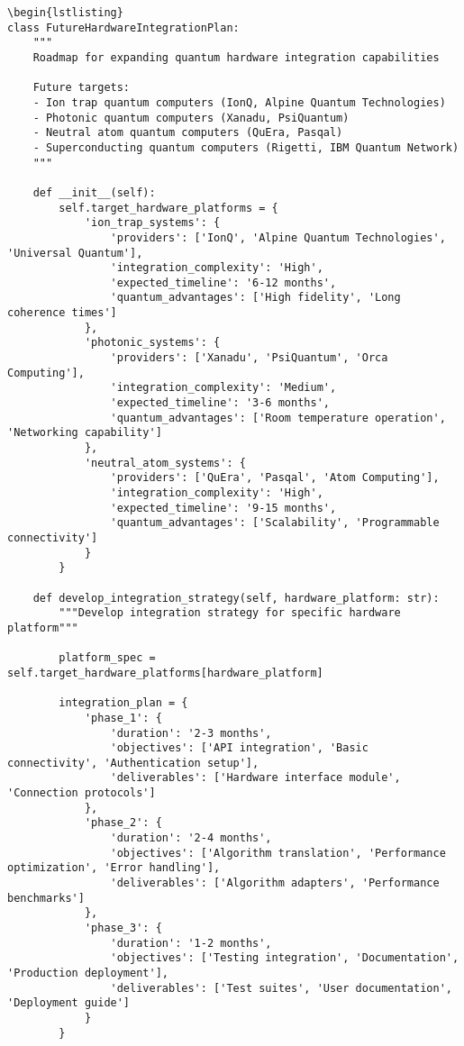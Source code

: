 \documentclass[12pt,a4paper]{report}
\begin{document}
\begin{lstlisting}
\begin{lstlisting}
class FutureHardwareIntegrationPlan:
    """
    Roadmap for expanding quantum hardware integration capabilities

    Future targets:
    - Ion trap quantum computers (IonQ, Alpine Quantum Technologies)
    - Photonic quantum computers (Xanadu, PsiQuantum)
    - Neutral atom quantum computers (QuEra, Pasqal)
    - Superconducting quantum computers (Rigetti, IBM Quantum Network)
    """

    def __init__(self):
        self.target_hardware_platforms = {
            'ion_trap_systems': {
                'providers': ['IonQ', 'Alpine Quantum Technologies', 'Universal Quantum'],
                'integration_complexity': 'High',
                'expected_timeline': '6-12 months',
                'quantum_advantages': ['High fidelity', 'Long coherence times']
            },
            'photonic_systems': {
                'providers': ['Xanadu', 'PsiQuantum', 'Orca Computing'],
                'integration_complexity': 'Medium',
                'expected_timeline': '3-6 months',
                'quantum_advantages': ['Room temperature operation', 'Networking capability']
            },
            'neutral_atom_systems': {
                'providers': ['QuEra', 'Pasqal', 'Atom Computing'],
                'integration_complexity': 'High',
                'expected_timeline': '9-15 months',
                'quantum_advantages': ['Scalability', 'Programmable connectivity']
            }
        }

    def develop_integration_strategy(self, hardware_platform: str):
        """Develop integration strategy for specific hardware platform"""

        platform_spec = self.target_hardware_platforms[hardware_platform]

        integration_plan = {
            'phase_1': {
                'duration': '2-3 months',
                'objectives': ['API integration', 'Basic connectivity', 'Authentication setup'],
                'deliverables': ['Hardware interface module', 'Connection protocols']
            },
            'phase_2': {
                'duration': '2-4 months',
                'objectives': ['Algorithm translation', 'Performance optimization', 'Error handling'],
                'deliverables': ['Algorithm adapters', 'Performance benchmarks']
            },
            'phase_3': {
                'duration': '1-2 months',
                'objectives': ['Testing integration', 'Documentation', 'Production deployment'],
                'deliverables': ['Test suites', 'User documentation', 'Deployment guide']
            }
        }


\end{lstlisting}
\end{document}
